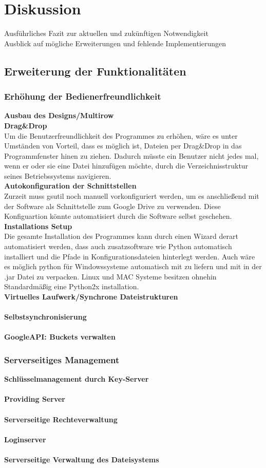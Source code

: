 \documentclass[12pt,a4paper,bibliography=totocnumbered,listof=totocnumbered]{scrartcl}
\begin{document}
\section{Diskussion}
Ausführliches Fazit zur aktuellen und zukünftigen Notwendigkeit\\
Ausblick auf mögliche Erweiterungen und fehlende Implementierungen

\subsection{Erweiterung der Funktionalitäten}
\subsubsection{Erhöhung der Bedienerfreundlichkeit}
\textbf{Ausbau des Designs/Multirow}
\\\textbf{Drag\&Drop}\\
Um die Benutzerfreundlichkeit des Programmes zu erhöhen, wäre es unter Umständen von Vorteil, dass es möglich ist, Dateien per Drag\&Drop in das Programmfenster hinen zu ziehen. Dadurch müsste ein Benutzer nicht jedes mal, wenn er oder sie eine Datei hinzufügen möchte, durch die Verzeichnisstruktur seines Betriebssystems navigieren.
\\\textbf{Autokonfiguration der Schnittstellen}\\
Zurzeit muss gsutil noch manuell vorkonfiguriert werden, um es anschließend mit der Software als Schnittstelle zum Google Drive zu verwenden. Diese Konfiguartion könnte automatisiert durch die Software selbst geschehen.
\\\textbf{Installations Setup}\\
Die gesamte Installation des Programmes kann durch einen Wizard derart automatisiert werden, dass auch zusatzsoftware wie Python automatisch installiert und die Pfade in Konfigurationsdateien hinterlegt werden. Auch wäre es möglich python für Windowssysteme automatisch mit zu liefern und mit in der .jar Datei zu verpacken. Linux und MAC Systeme besitzen ohnehin Standardmäßig eine Python2x installation.
\\\textbf{Virtuelles Laufwerk/Synchrone Dateistrukturen}\\
\\\textbf{Selbstsynchronisierung}\\
\\\textbf{GoogleAPI: Buckets verwalten}\\

\subsubsection{Serverseitiges Management}
\textbf{Schlüsselmanagement durch Key-Server}\\
\\\textbf{Providing Server}\\
\\\textbf{Serverseitige Rechteverwaltung}\\
\\\textbf{Loginserver}\\
\\\textbf{Serverseitige Verwaltung des Dateisystems}\\
\end{document}
